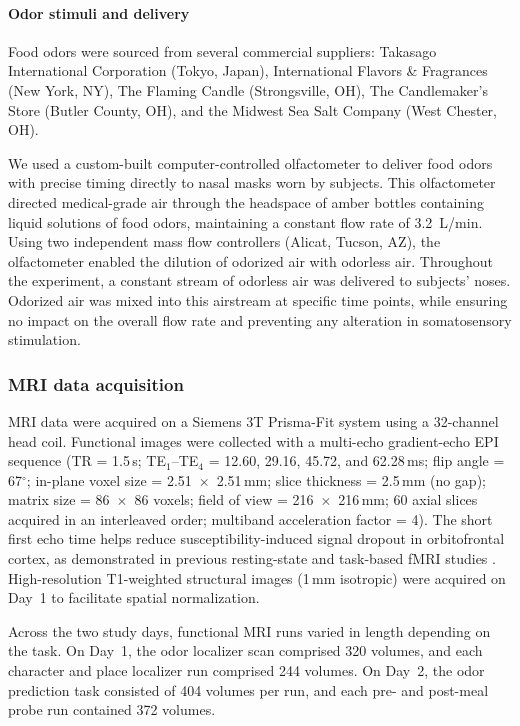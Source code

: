 \documentclass[12pt,letterpaper]{article}
\begin{document}
\paragraph*{Odor stimuli and delivery}

Food odors were sourced from several commercial suppliers: Takasago International Corporation (Tokyo, Japan), International Flavors \& Fragrances (New York, NY), The Flaming Candle (Strongsville, OH), The Candlemaker’s Store (Butler County, OH), and the Midwest Sea Salt Company (West Chester, OH).

We used a custom-built computer-controlled olfactometer to deliver food odors with precise timing directly to nasal masks worn by subjects. This olfactometer directed medical-grade air through the headspace of amber bottles containing liquid solutions of food odors, maintaining a constant flow rate of 3.2~L/min. Using two independent mass flow controllers (Alicat, Tucson, AZ), the olfactometer enabled the dilution of odorized air with odorless air. Throughout the experiment, a constant stream of odorless air was delivered to subjects’ noses. Odorized air was mixed into this airstream at specific time points, while ensuring no impact on the overall flow rate and preventing any alteration in somatosensory stimulation.

\subsubsection*{MRI data acquisition}

MRI data were acquired on a Siemens 3T Prisma-Fit system using a 32-channel head coil. Functional images were collected with a multi-echo gradient-echo EPI sequence (TR = 1.5\,s; TE$_1$--TE$_4$ = 12.60, 29.16, 45.72, and 62.28\,ms; flip angle = 67$^\circ$; in-plane voxel size = 2.51~$\times$~2.51\,mm; slice thickness = 2.5\,mm (no gap); matrix size = 86~$\times$~86 voxels; field of view = 216~$\times$~216\,mm; 60 axial slices acquired in an interleaved order; multiband acceleration factor = 4). The short first echo time helps reduce susceptibility-induced signal dropout in orbitofrontal cortex, as demonstrated in previous resting-state and task-based fMRI studies \citep{RN619,RN524,kirlutpos16,zhao24img}. High-resolution T1-weighted structural images (1\,mm isotropic) were acquired on Day~1 to facilitate spatial normalization.

Across the two study days, functional MRI runs varied in length depending on the task. On Day~1, the odor localizer scan comprised 320 volumes, and each character and place localizer run comprised 244 volumes. On Day~2, the odor prediction task consisted of 404 volumes per run, and each pre- and post-meal probe run contained 372 volumes.
\end{document}
